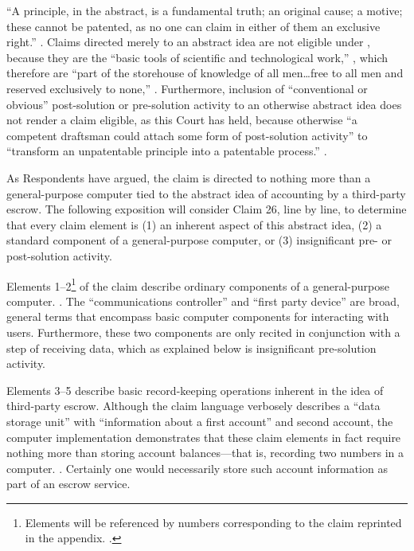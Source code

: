 \documentclass{scotus}
\begin{document}
``A principle, in the abstract, is a fundamental truth; an original cause; a
motive; these cannot be patented, as no one can claim in either of them an
exclusive right.'' .
Claims directed merely to an abstract idea are
not eligible under , because they are the ``basic tools of
scientific and technological work,'' , which therefore
are ``part of the storehouse of knowledge of all men\ldots free to all men and
reserved exclusively to none,'' . Furthermore, inclusion of ``conventional or
obvious''
post-solution or pre-solution activity to an otherwise abstract idea does not
render a claim eligible, as this Court has held, because otherwise
``a competent draftsman could attach some form of post-solution activity'' to
``transform an unpatentable principle into a patentable process.''
.

As Respondents have argued, the claim is directed to nothing more than a
general-purpose computer tied to the abstract idea of accounting by a
third-party escrow. The following exposition will consider Claim 26, line by
line, to determine that every claim element is (1) an inherent aspect of this
abstract idea, (2) a standard component of a general-purpose computer, or
(3) insignificant pre- or post-solution activity.


Elements 1--2\footnote{Elements will be referenced by numbers corresponding to
the claim reprinted in the appendix. .} of the
claim describe ordinary components of a general-purpose computer. . The ``communications controller'' and
``first party device'' are broad, general terms that encompass basic computer
components for interacting with users. Furthermore, these two components are
only recited in conjunction with a step of receiving data, which as explained
below is insignificant pre-solution activity.

Elements 3--5 describe basic record-keeping operations inherent in the idea of
third-party escrow. Although the claim language verbosely describes a ``data
storage unit'' with ``information about a first account'' and second account,
the computer implementation demonstrates that these claim elements in fact
require nothing more than storing account balances---that is, recording two
numbers in a computer. .
Certainly one would necessarily store such account information as part of an
escrow service.
\end{document}
